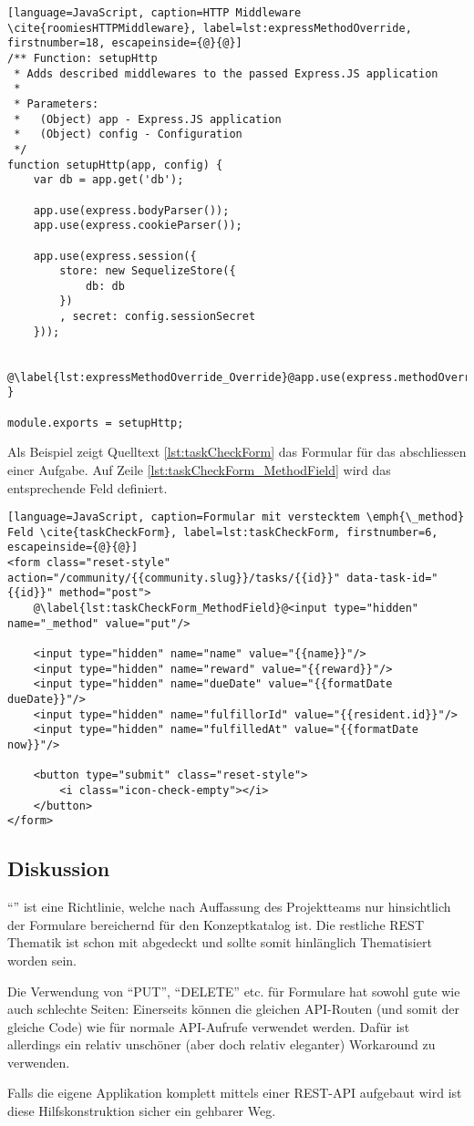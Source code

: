 \begin{lstlisting}[language=JavaScript, caption=HTTP Middleware \cite{roomiesHTTPMiddleware}, label=lst:expressMethodOverride, firstnumber=18, escapeinside={@}{@}]
/** Function: setupHttp
 * Adds described middlewares to the passed Express.JS application
 *
 * Parameters:
 *   (Object) app - Express.JS application
 *   (Object) config - Configuration
 */
function setupHttp(app, config) {
	var db = app.get('db');

	app.use(express.bodyParser());
	app.use(express.cookieParser());

	app.use(express.session({
		store: new SequelizeStore({
			db: db
		})
		, secret: config.sessionSecret
	}));

	@\label{lst:expressMethodOverride_Override}@app.use(express.methodOverride());
}

module.exports = setupHttp;
\end{lstlisting}

Als Beispiel zeigt Quelltext \ref{lst:taskCheckForm} das Formular für das abschliessen einer Aufgabe. Auf Zeile \ref{lst:taskCheckForm_MethodField} wird das entsprechende Feld definiert.

\begin{lstlisting}[language=JavaScript, caption=Formular mit verstecktem \emph{\_method} Feld \cite{taskCheckForm}, label=lst:taskCheckForm, firstnumber=6, escapeinside={@}{@}]
<form class="reset-style" action="/community/{{community.slug}}/tasks/{{id}}" data-task-id="{{id}}" method="post">
	@\label{lst:taskCheckForm_MethodField}@<input type="hidden" name="_method" value="put"/>

	<input type="hidden" name="name" value="{{name}}"/>
	<input type="hidden" name="reward" value="{{reward}}"/>
	<input type="hidden" name="dueDate" value="{{formatDate dueDate}}"/>
	<input type="hidden" name="fulfillorId" value="{{resident.id}}"/>
	<input type="hidden" name="fulfilledAt" value="{{formatDate now}}"/>

	<button type="submit" class="reset-style">
		<i class="icon-check-empty"></i>
	</button>
</form>
\end{lstlisting}

\subsection*{Diskussion}

``'' ist eine Richtlinie, welche nach Auffassung des Projektteams nur hinsichtlich der Formulare bereichernd für den Konzeptkatalog ist. Die restliche \gls{REST} Thematik ist schon mit  abgedeckt und sollte somit hinlänglich Thematisiert worden sein.

Die Verwendung von ``PUT'', ``DELETE'' etc. für Formulare hat sowohl gute wie auch schlechte Seiten: Einerseits können die gleichen API-Routen (und somit der gleiche Code) wie für normale API-Aufrufe verwendet werden. Dafür ist allerdings ein relativ unschöner (aber doch relativ eleganter) Workaround zu verwenden.

Falls die eigene Applikation komplett mittels einer \gls{REST}-API aufgebaut wird ist diese Hilfskonstruktion sicher ein gehbarer Weg.